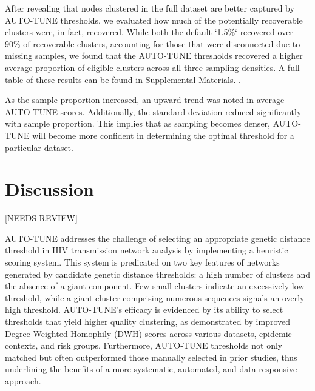 \documentclass[utf8]{FrontiersinHarvard} %
\newcommand{\TODO}[1]{{\color{red}{#1}}}
\begin{document}
After revealing that nodes clustered in the full dataset are better captured by
AUTO-TUNE thresholds, we evaluated how much of the potentially recoverable
clusters were, in fact, recovered. While both the default `1.5\%` recovered over
90\% of recoverable clusters, accounting for those that were disconnected due to
missing samples, we found that the AUTO-TUNE thresholds recovered a higher
average proportion of eligible clusters across all three sampling densities. A
full table of these results can be found in Supplemental Materials. \TODO{Create
another visualization}.

As the sample proportion increased, an upward trend was noted in average
AUTO-TUNE scores. Additionally, the standard deviation reduced significantly
with sample proportion. This implies that as sampling becomes denser, AUTO-TUNE
will become more confident in determining the optimal threshold for a
particular dataset.

\section{Discussion}

[NEEDS REVIEW]




AUTO-TUNE addresses the challenge of selecting an appropriate genetic distance
threshold in HIV transmission network analysis by implementing a heuristic
scoring system. This system is predicated on two key features of networks
generated by candidate genetic distance thresholds: a high number of clusters
and the absence of a giant component. Few small clusters indicate an
excessively low threshold, while a giant cluster comprising numerous sequences
signals an overly high threshold. AUTO-TUNE's efficacy is evidenced by its
ability to select thresholds that yield higher quality clustering, as
demonstrated by improved Degree-Weighted Homophily (DWH) scores across various
datasets, epidemic contexts, and risk groups. Furthermore, AUTO-TUNE thresholds
not only matched but often outperformed those manually selected in prior
studies, thus underlining the benefits of a more systematic, automated, and
data-responsive approach.
\end{document}
